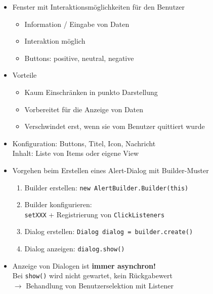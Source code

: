 \documentclass[a4paper]{article}
\begin{document}
\begin{itemize}
	\item Fenster mit Interaktionsmöglichkeiten für den Benutzer
		\begin{itemize}
			\item Information / Eingabe von Daten
			\item Interaktion möglich
			\item Buttons: positive, neutral, negative
		\end{itemize}
	\item Vorteile
	\begin{itemize}
		\item Kaum Einschränken in punkto Darstellung
		\item Vorbereitet für die Anzeige von Daten
		\item Verschwindet erst, wenn sie vom Benutzer quittiert wurde
	\end{itemize}
	\item Konfiguration: Buttons, Titel, Icon, Nachricht\\
	Inhalt: Liste von Items oder eigene View
\end{itemize}

\newpage

\begin{itemize}
	\item Vorgehen beim Erstellen eines Alert-Dialog mit Builder-Muster
	\begin{enumerate}
		\item Builder erstellen: \texttt{new AlertBuilder.Builder(this)}
		\item Builder konfigurieren: \\
		\texttt{setXXX} + Registrierung von \texttt{ClickListeners}
		\item Dialog erstellen: \texttt{Dialog dialog = builder.create()}
		\item Dialog anzeigen: \texttt{dialog.show()}
	\end{enumerate}
	\item Anzeige von Dialogen ist \textbf{immer asynchron!}\\
	Bei \texttt{show()} wird nicht gewartet, kein Rückgabewert\\
	$\rightarrow$ Behandlung von Benutzerselektion mit Listener
\end{itemize}
\end{document}

